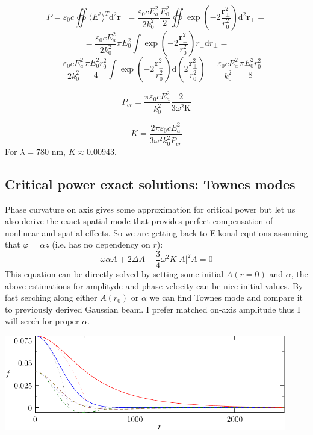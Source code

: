 \documentclass{article}
\newcommand{\ff}{\frac}
\begin{document}
\[ P = \varepsilon_0 c \oiint \langle E^2 \rangle^T \mathrm{d}^2 \mathbf{r}_\perp = \frac{\varepsilon_0 c E_a^2}{2 k_0^2} \frac{E_0^2}{2} \oiint \exp\left(-2\frac{\mathbf{r}^2_\perp}{r_0^2}\right) \mathrm{d}^2 \mathbf{r}_\perp = \] 
\[ = \frac{\varepsilon_0 c E_a^2}{2 k_0^2} \pi E_0^2 \int \exp\left(-2\frac{\mathbf{r}^2_\perp}{r_0^2}\right) r_\perp \mathrm{d} r_\perp = \]
\[ = \frac{\varepsilon_0 c E_a^2}{2 k_0^2} \frac{\pi E_0^2 r_0^2}{4} \int \exp\left(-2\frac{\mathbf{r}^2_\perp}{r_0^2}\right)  \mathrm{d} \left(2\frac{\mathbf{r}^2_\perp}{r_0^2}\right) = \frac{\varepsilon_0 c E_a^2}{k_0^2} \frac{\pi E_0^2 r_0^2}{8} \]

\[ P_{cr} = \frac{\pi \varepsilon_0 c E_a^2}{k_0^2} \frac{2}{3\omega^2 \mathrm{K}} \]

\[ K = \frac{2 \pi \varepsilon_0 c E_a^2}{3 \omega^2 k_0^2 P_{cr}} \]
For $\lambda=780$ nm, $K\approx 0.00943$.
\subsection{Critical power exact solutions: Townes modes}
Phase curvature on axis gives some approximation for critical power but let us also derive the exact spatial mode that provides perfect compensation of nonlinear and spatial effects. So we are getting back to Eikonal equtions assuming that $\varphi = \alpha z$ (i.e. has no dependency on $r$):
\[ \omega \alpha A  + 2 \Delta A  + \ff{3}{4} \omega^2 K |A|^2 A = 0 \]
This equation can be directly solved by setting some initial $A(r=0)$ and $\alpha$, the above estimations for amplityde and phase velocity can be nice initial values. By fast serching along either $A(r_0)$ or $\alpha$ we can find Townes mode and compare it to previously derived Gaussian beam. I prefer matched on-axis amplitude thus I will serch for proper $\alpha$.

\begin{center}
\includegraphics[width=12.3cm]{test/townes/townes.pdf}
\label{figTownes}
\end{center}
\end{document}

